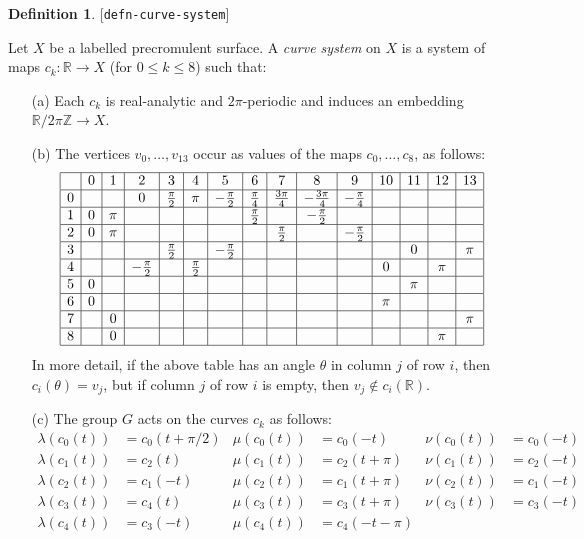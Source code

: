 \documentclass[reqno]{amsart}
\newcommand{\lbl}[1]{\label{#1}\textup{[\texttt{#1}]}\par}
\newcommand{\lbl}{\label}
\newcommand{\tht}       {\theta}
\newcommand{\lm}        {\lambda}
\newcommand{\Z}         {{\mathbb{Z}}}
\newcommand{\R}         {{\mathbb{R}}}
\newcommand{\ppi}       {\tfrac{\pi}{2}}
\renewcommand{\:}{\colon}
\theoremstyle{definition}
\newtheorem{definition}[theorem]{Definition}
\begin{document}
\begin{definition}\lbl{defn-curve-system}
 Let $X$ be a labelled precromulent surface.  A \emph{curve system} on
 $X$ is a system of maps $c_k\:\R\to X$ (for $0\leq k\leq 8$) such
 that:
 \begin{itemize}
  \item[(a)] Each $c_k$ is real-analytic and $2\pi$-periodic and induces an
   embedding $\R/2\pi\Z\to X$.
  \item[(b)] The vertices $v_0,\dotsc,v_{13}$ occur as values of the maps
   $c_0,\dotsc,c_8$, as follows:
   \[ \begin{array}{|c|c|c|c|c|c|c|c|c|c|c|c|c|c|c|}
   \hline
   &0&1&2&3&4&5&6&7&8&9&10&11&12&13\\ \hline
    0&&&0&\ppi&\pi&-\ppi&\tfrac{\pi}{4}&\tfrac{3\pi}{4}&-\tfrac{3\pi}{4}&-\tfrac{\pi}{4}&&&&\\ \hline
    1&0&\pi&&&&&\ppi&&-\ppi&&&&&\\ \hline
    2&0&\pi&&&&&&\ppi&&-\ppi&&&&\\ \hline
    3&&&&\ppi&&-\ppi&&&&&&0&&\pi\\ \hline
    4&&&-\ppi&&\ppi&&&&&&0&&\pi&\\ \hline
    5&0&&&&&&&&&&&\pi&&\\ \hline
    6&0&&&&&&&&&&\pi&&&\\ \hline
    7&&0&&&&&&&&&&&&\pi\\ \hline
    8&&0&&&&&&&&&&&\pi&\\ \hline
   \end{array} \]
   In more detail, if the above table has an angle $\tht$ in column
   $j$ of row $i$, then $c_i(\tht)=v_j$, but if column $j$ of row $i$
   is empty, then $v_j\not\in c_i(\R)$.
  \item[(c)] The group $G$ acts on the curves $c_k$ as follows:
   \begin{align*}
    \lm(c_{ 0}(t)) &= c_{ 0}( t+\pi/2) &
    \mu(c_{ 0}(t)) &= c_{ 0}(-t)       &
    \nu(c_{ 0}(t)) &= c_{ 0}(-t) \\
    \lm(c_{ 1}(t)) &= c_{ 2}( t)       &
    \mu(c_{ 1}(t)) &= c_{ 2}( t + \pi) &
    \nu(c_{ 1}(t)) &= c_{ 2}(-t) \\
    \lm(c_{ 2}(t)) &= c_{ 1}(-t)       &
    \mu(c_{ 2}(t)) &= c_{ 1}( t + \pi) &
    \nu(c_{ 2}(t)) &= c_{ 1}(-t) \\
    \lm(c_{ 3}(t)) &= c_{ 4}( t)       &
    \mu(c_{ 3}(t)) &= c_{ 3}( t + \pi) &
    \nu(c_{ 3}(t)) &= c_{ 3}(-t) \\
    \lm(c_{ 4}(t)) &= c_{ 3}(-t)       &
    \mu(c_{ 4}(t)) &= c_{ 4}(-t - \pi) &

\end{align*}
\end{itemize}
\end{definition}
\end{document}
